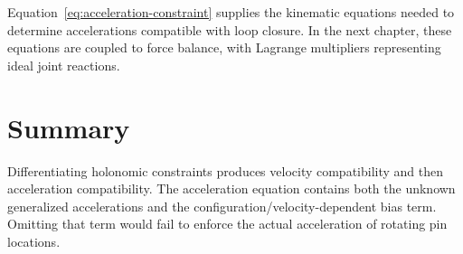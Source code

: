 \documentclass[../main.tex]{subfiles}
\begin{document}
Equation~\eqref{eq:acceleration-constraint} supplies the kinematic equations needed to determine accelerations compatible with loop closure. In the next chapter, these equations are coupled to force balance, with Lagrange multipliers representing ideal joint reactions.

\section{Summary}

Differentiating holonomic constraints produces velocity compatibility and then acceleration compatibility. The acceleration equation contains both the unknown generalized accelerations and the configuration/velocity-dependent bias term. Omitting that term would fail to enforce the actual acceleration of rotating pin locations.

\ifSubfilesClassLoaded{\backmatter\bookbibliography}{}
\end{document}
